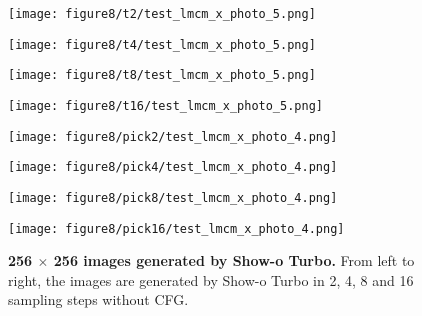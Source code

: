 \begin{figure*}[htbp]
    \begin{minipage}{0.21\textwidth}
        \texttt{[image: figure8/t2/test\_lmcm\_x\_photo\_5.png]}
    \end{minipage}\hspace{0.1cm}%
    \begin{minipage}{0.21\textwidth}
        \texttt{[image: figure8/t4/test\_lmcm\_x\_photo\_5.png]}
    \end{minipage}\hspace{0.1cm}%
    \begin{minipage}{0.21\textwidth}
        \texttt{[image: figure8/t8/test\_lmcm\_x\_photo\_5.png]}
    \end{minipage}\hspace{0.1cm}%
    \begin{minipage}{0.21\textwidth}
        \texttt{[image: figure8/t16/test\_lmcm\_x\_photo\_5.png]}
    \end{minipage}\hspace{0.1cm}%

    \vspace{-0.1cm}

    \begin{minipage}{0.21\textwidth}
        \texttt{[image: figure8/pick2/test\_lmcm\_x\_photo\_4.png]}
    \end{minipage}\hspace{0.1cm}%
    \begin{minipage}{0.21\textwidth}
        \texttt{[image: figure8/pick4/test\_lmcm\_x\_photo\_4.png]}
    \end{minipage}\hspace{0.1cm}%
    \begin{minipage}{0.21\textwidth}
        \texttt{[image: figure8/pick8/test\_lmcm\_x\_photo\_4.png]}
    \end{minipage}\hspace{0.1cm}%
    \begin{minipage}{0.21\textwidth}
        \texttt{[image: figure8/pick16/test\_lmcm\_x\_photo\_4.png]}
    \end{minipage}%
    \vspace{-0.1cm}

    \caption{\small \textbf{256 $\times$ 256 images generated by Show-o Turbo.} From left to right, the images are generated by Show-o Turbo in 2, 4, 8 and 16 sampling steps without CFG.}
    \label{fig:display}
\end{figure*}


